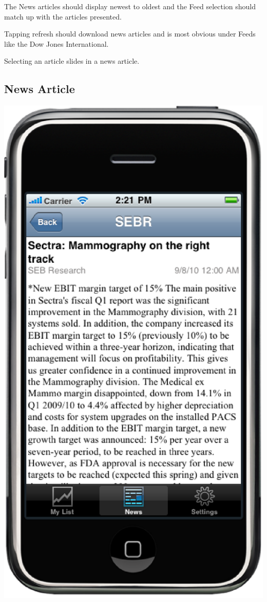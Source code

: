 \documentclass[12pt,twoside,letterpaper]{report}
\begin{document}
The News articles should display newest to oldest and the Feed selection should match up with the articles presented.

Tapping refresh should download news articles and is most obvious under Feeds like the Dow Jones International.

Selecting an article slides in a news article.

\subsection*{News Article}
\includegraphics[scale=0.5]{newsArticle}
\end{document}
